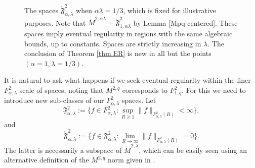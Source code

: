 \documentclass[11pt]{article}
\numberwithin{equation}{section}
\theoremstyle{remark}
\theoremstyle{definition}
\newcommand\al{\alpha}
\newcommand\la{\lambda}
\newcommand{\I}{\infty}
\newcommand{\EQ}[1]{\begin{equation} #1 \end{equation}}
\begin{document}
%
\begin{figure}
\begin{center}

\caption{The spaces $\mathring {\mathfrak F}^{2}_{\al,\la} $ when $\al\la =1/3$, which is fixed for illustrative purposes.  Note that $\mathring M^{2,\al\la}=\mathring {\mathfrak F}^{2}_{1,\al\la}$ by Lemma \ref{Mpq-centered}. These spaces imply eventual regularity in regions with the same algebraic bounds, up to  constants. Spaces are strictly increasing in $\la$. The conclusion of Theorem \ref{thm.ER} is new in all but the points  $(\al=1,\la=1/3)$.}
\label{figure.ER}
\end{center}
\end{figure}

It is natural to ask what happens if we seek eventual regularity within the finer $F^2_{\al,\la}$ scale of spaces, noting that $M^{2,q}$ corresponds to $F^2_{1,q}$. For this we need to introduce new sub-classes of  our $F^2_{\al,\la}$ spaces. Let
\EQ{\label{Ffrak.def}
\mathfrak F^{2}_{\al,\la} := \{f \in F^{2}_{\al,\la}: \sup_{R\geq 1} \|f\|_{  F^{2}_{\al,\la}(R)  }<\I  \},
}
and
\EQ{\label{Ffrak0.def}
\mathring {\mathfrak F}^{2}_{\al,\la} := \{f \in \mathfrak F^{2}_{\al,\la}: \lim_{R\to \I}  \|f\|_{  F^{2}_{\al,\la}(R)  }=0  \}.
}
The latter is necessarily a subspace of $\mathring M^{2,\la}$, which can be easily seen using an alternative definition of the $M^{2,q}$ norm given in \cite{BKT}.
\end{document}
